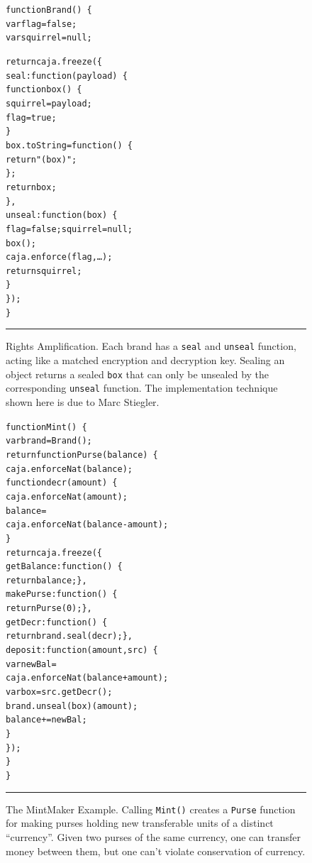 \documentclass[letterpaper,twocolumn,10pt]{article}
\newcommand{\code}[1]{{\tt {#1}}}              %
\begin{document}
\begin{figure}[t!]
\begin{alltt}
function Brand()\ \{
  var flag = false;
  var squirrel = null;

  return caja.freeze(\{
    seal: function(payload)\ \{
      function box()\ \{
        squirrel = payload;
        flag = true;
      \}
      box.toString = function()\ \{
        return "(box)";
      \};
      return box;
    \},
    unseal: function(box)\ \{
      flag = false; squirrel = null;
      box();
      caja.enforce(flag,\ldots);
      return squirrel;
    \}
  \});
\}
\end{alltt}

\caption[Rights Amplification]{Rights Amplification. Each brand has a 
\code{seal} and \code{unseal} function, acting like a matched encryption and 
decryption key. Sealing an object returns a sealed \code{box} that can only 
be unsealed by the corresponding \code{unseal} function. The implementation 
technique shown here is due to Marc Stiegler.
\\ } \hrule
\label{fig:rights-amp}
\end{figure}

\begin{figure}[t!]
\begin{alltt}
function Mint()\ \{
  var brand = Brand();
  return function Purse(balance)\ \{
    caja.enforceNat(balance);
    function decr(amount)\ \{
      caja.enforceNat(amount);
      balance = 
        caja.enforceNat(balance - amount);
    \}
    return caja.freeze(\{
      getBalance: function()\ \{
        return balance; \},
      makePurse: function()\ \{
        return Purse(0); \},
      getDecr: function()\ \{
        return brand.seal(decr); \},
      deposit: function(amount,src)\ \{
        var newBal = 
          caja.enforceNat(balance+amount);
        var box = src.getDecr();
        brand.unseal(box)(amount);
        balance += newBal;
      \}
    \});
  \}
\}
\end{alltt}

\caption[The MintMaker Example]{The MintMaker Example. Calling \code{Mint()} 
creates a \code{Purse} function for making purses holding new transferable 
units of a distinct ``currency''. Given two purses of the same currency, one 
can transfer money between them, but one can't violate conservation of 
currency. \\ } \hrule
\label{fig:mintmaker}
\end{figure}

\end{document}
